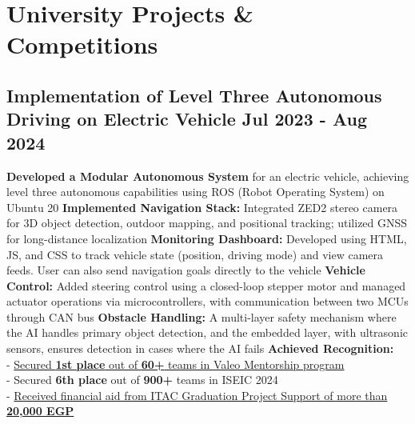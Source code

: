 \section*{University Projects \& Competitions}
%
%
%
\subsection*{
  Implementation of Level Three Autonomous Driving on Electric Vehicle
  \hspace*{\fill}
  \dateformat Jul 2023 - Aug 2024
}
\begin{tasks}
  \task \textbf{Developed a Modular Autonomous System} for an electric vehicle, achieving level three autonomous capabilities using ROS (Robot Operating System) on Ubuntu 20
  \task \textbf{Implemented Navigation Stack:} Integrated ZED2 stereo camera for 3D object detection, outdoor mapping, and positional tracking; utilized GNSS for long-distance localization
  \task \textbf{Monitoring Dashboard:} Developed using HTML, JS, and CSS to track vehicle state (position, driving mode) and view camera feeds. User can also send navigation goals directly to the vehicle
  \task \textbf{Vehicle Control:} Added steering control using a closed-loop stepper motor and managed actuator operations via microcontrollers, with communication between two MCUs through CAN bus
  \task \textbf{Obstacle Handling:} A multi-layer safety mechanism where the AI handles primary object detection, and the embedded layer, with ultrasonic sensors, ensures detection in cases where the AI fails
  \task \textbf{Achieved Recognition:}\\
    - \href{https://www.linkedin.com/feed/update/urn:li:activity:7230237292680933376/}{Secured \textbf{1st place} out of \textbf{60+} teams in Valeo Mentorship program}\\
    - Secured \textbf{6th place} out of \textbf{900+} teams in ISEIC 2024\\
    - \href{https://itida.gov.eg/English/Programs/Graduation/Documents/List-of-Accepted-Graduation-Projects-Round-19-new.pdf}{Received financial aid from ITAC Graduation Project Support of more than \textbf{20,000 EGP}}
\end{tasks}
%
%
%

